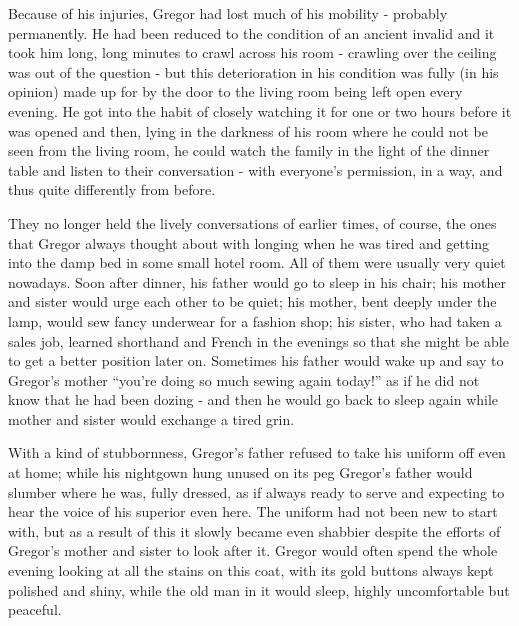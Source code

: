 \documentclass[12pt]{report}
\begin{document}
Because of his injuries, Gregor had lost much of his mobility - probably
permanently. He had been reduced to the condition of an ancient invalid
and it took him long, long minutes to crawl across his room - crawling
over the ceiling was out of the question - but this deterioration in his
condition was fully (in his opinion) made up for by the door to the
living room being left open every evening. He got into the habit of
closely watching it for one or two hours before it was opened and then,
lying in the darkness of his room where he could not be seen from the
living room, he could watch the family in the light of the dinner table
and listen to their conversation - with everyone's permission, in a way,
and thus quite differently from before.

They no longer held the lively conversations of earlier times, of
course, the ones that Gregor always thought about with longing when he
was tired and getting into the damp bed in some small hotel room. All of
them were usually very quiet nowadays. Soon after dinner, his father
would go to sleep in his chair; his mother and sister would urge each
other to be quiet; his mother, bent deeply under the lamp, would sew
fancy underwear for a fashion shop; his sister, who had taken a sales
job, learned shorthand and French in the evenings so that she might be
able to get a better position later on. Sometimes his father would wake
up and say to Gregor's mother ``you're doing so much sewing again
today!'' as if he did not know that he had been dozing - and then he
would go back to sleep again while mother and sister would exchange a
tired grin.

With a kind of stubbornness, Gregor's father refused to take his uniform
off even at home; while his nightgown hung unused on its peg Gregor's
father would slumber where he was, fully dressed, as if always ready to
serve and expecting to hear the voice of his superior even here. The
uniform had not been new to start with, but as a result of this it
slowly became even shabbier despite the efforts of Gregor's mother and
sister to look after it. Gregor would often spend the whole evening
looking at all the stains on this coat, with its gold buttons always
kept polished and shiny, while the old man in it would sleep, highly
uncomfortable but peaceful.
\end{document}
